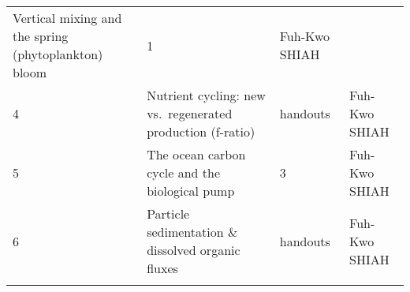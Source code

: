 \documentclass[
]{article}
\begin{document}
\begin{longtable}[]{@{}llll@{}}
\begin{minipage}[t]{0.23\columnwidth}
Vertical mixing and the spring (phytoplankton) bloom\strut
\end{minipage} & \begin{minipage}[t]{0.23\columnwidth}\raggedright
1\strut
\end{minipage} & \begin{minipage}[t]{0.30\columnwidth}\raggedright
Fuh-Kwo SHIAH\strut
\end{minipage}\tabularnewline
\begin{minipage}[t]{0.13\columnwidth}\raggedright
4\strut
\end{minipage} & \begin{minipage}[t]{0.23\columnwidth}\raggedright
Nutrient cycling: new vs.~regenerated production (f-ratio)\strut
\end{minipage} & \begin{minipage}[t]{0.23\columnwidth}\raggedright
handouts\strut
\end{minipage} & \begin{minipage}[t]{0.30\columnwidth}\raggedright
Fuh-Kwo SHIAH\strut
\end{minipage}\tabularnewline
\begin{minipage}[t]{0.13\columnwidth}\raggedright
5\strut
\end{minipage} & \begin{minipage}[t]{0.23\columnwidth}\raggedright
The ocean carbon cycle and the biological pump\strut
\end{minipage} & \begin{minipage}[t]{0.23\columnwidth}\raggedright
3\strut
\end{minipage} & \begin{minipage}[t]{0.30\columnwidth}\raggedright
Fuh-Kwo SHIAH\strut
\end{minipage}\tabularnewline
\begin{minipage}[t]{0.13\columnwidth}\raggedright
6\strut
\end{minipage} & \begin{minipage}[t]{0.23\columnwidth}\raggedright
Particle sedimentation \& dissolved organic fluxes\strut
\end{minipage} & \begin{minipage}[t]{0.23\columnwidth}\raggedright
handouts\strut
\end{minipage} & \begin{minipage}[t]{0.30\columnwidth}\raggedright
Fuh-Kwo SHIAH\strut
\end{minipage}\tabularnewline
\begin{minipage}[t]{0.13\columnwidth}\raggedright

\end{minipage}
\end{longtable}
\end{document}
